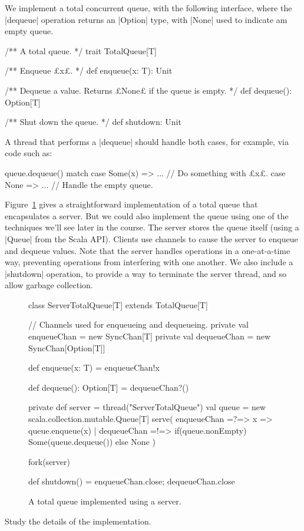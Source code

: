 
We implement a total concurrent queue, with the following interface,
where the |dequeue| operation returns an |Option| type, with |None| used to
indicate am empty queue. 
%
\begin{scala}
/** A total queue. */
trait TotalQueue[T]{
  /** Enqueue £x£. */
  def enqueue(x: T): Unit

  /** Dequeue a value.  Returns £None£ if the queue is empty. */
  def dequeue(): Option[T]

  /** Shut down the queue. */
  def shutdown: Unit
}
\end{scala}

A thread that performs a |dequeue| should handle both cases, for example, via
code such as:
\begin{scala}
  queue.dequeue() match{
    case Some(x) => ... // Do something with £x£.
    case None => ... // Handle the empty queue.
  }
\end{scala}

Figure~\ref{fig:total-queue-server} gives a straightforward implementation of
a total queue that encapsulates a server.  But we could also implement the
queue using one of the techniques we'll see later in the course.  The server
stores the queue itself (using a |Queue| from the Scala API).  Clients use
channels to cause the server to enqueue and dequeue values.  Note that the
server handles operations in a one-at-a-time way, preventing operations from
interfering with one another.  We also include a |shutdown| operation, to
provide a way to terminate the server thread, and so allow garbage collection.


\begin{figure}
\begin{scala}
class ServerTotalQueue[T] extends TotalQueue[T]{
  // Channels used for enqueueing and dequeueing.
  private val enqueueChan = new SyncChan[T]
  private val dequeueChan = new SyncChan[Option[T]]

  def enqueue(x: T) = enqueueChan!x

  def dequeue(): Option[T] = dequeueChan?()

  private def server = thread("ServerTotalQueue"){
    val queue = new scala.collection.mutable.Queue[T]
    serve(
      enqueueChan =?=> { x => queue.enqueue(x) }
      | dequeueChan =!=> { 
          if(queue.nonEmpty) Some(queue.dequeue()) else None 
        }
    )
  }

  fork(server)

  def shutdown() = { enqueueChan.close; dequeueChan.close }
}
\end{scala}
\caption{A total queue implemented using a server.}
\label{fig:total-queue-server}
\end{figure}


\begin{instruction}
Study the details of the implementation.
\end{instruction}


